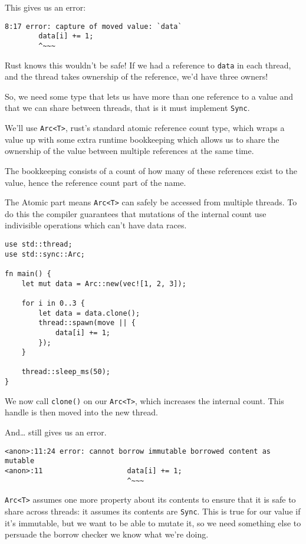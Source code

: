 \documentclass[a4paper,]{book}
\begin{document}
This gives us an error:

\begin{verbatim}
8:17 error: capture of moved value: `data`
        data[i] += 1;
        ^~~~
\end{verbatim}

Rust knows this wouldn't be safe! If we had a reference to \texttt{data}
in each thread, and the thread takes ownership of the reference, we'd
have three owners!

So, we need some type that lets us have more than one reference to a
value and that we can share between threads, that is it must implement
\texttt{Sync}.

We'll use \texttt{Arc\textless{}T\textgreater{}}, rust's standard atomic
reference count type, which wraps a value up with some extra runtime
bookkeeping which allows us to share the ownership of the value between
multiple references at the same time.

The bookkeeping consists of a count of how many of these references
exist to the value, hence the reference count part of the name.

The Atomic part means \texttt{Arc\textless{}T\textgreater{}} can safely
be accessed from multiple threads. To do this the compiler guarantees
that mutations of the internal count use indivisible operations which
can't have data races.

\begin{verbatim}
use std::thread;
use std::sync::Arc;

fn main() {
    let mut data = Arc::new(vec![1, 2, 3]);

    for i in 0..3 {
        let data = data.clone();
        thread::spawn(move || {
            data[i] += 1;
        });
    }

    thread::sleep_ms(50);
}
\end{verbatim}

We now call \texttt{clone()} on our
\texttt{Arc\textless{}T\textgreater{}}, which increases the internal
count. This handle is then moved into the new thread.

And\ldots{} still gives us an error.

\begin{verbatim}
<anon>:11:24 error: cannot borrow immutable borrowed content as mutable
<anon>:11                    data[i] += 1;
                             ^~~~
\end{verbatim}

\texttt{Arc\textless{}T\textgreater{}} assumes one more property about
its contents to ensure that it is safe to share across threads: it
assumes its contents are \texttt{Sync}. This is true for our value if
it's immutable, but we want to be able to mutate it, so we need
something else to persuade the borrow checker we know what we're doing.
\end{document}
